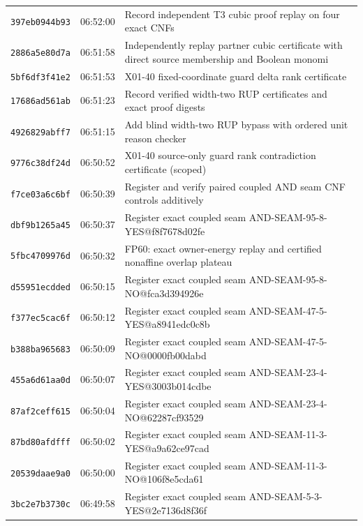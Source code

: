 \documentclass[11pt]{article}
\theoremstyle{remark}
\begin{document}
\begin{longtable}{lll}
\texttt{397eb0944b93} & 06:52:00 & {\footnotesize Record independent T3 cubic proof replay on four exact CNFs}\\
\texttt{2886a5e80d7a} & 06:51:58 & {\footnotesize Independently replay partner cubic certificate with direct source membership and Boolean monomi}\\
\texttt{5bf6df3f41e2} & 06:51:53 & {\footnotesize X01-40 fixed-coordinate guard delta rank certificate}\\
\texttt{17686ad561ab} & 06:51:23 & {\footnotesize Record verified width-two RUP certificates and exact proof digests}\\
\texttt{4926829abff7} & 06:51:15 & {\footnotesize Add blind width-two RUP bypass with ordered unit reason checker}\\
\texttt{9776c38df24d} & 06:50:52 & {\footnotesize X01-40 source-only guard rank contradiction certificate (scoped)}\\
\texttt{f7ce03a6c6bf} & 06:50:39 & {\footnotesize Register and verify paired coupled AND seam CNF controls additively}\\
\texttt{dbf9b1265a45} & 06:50:37 & {\footnotesize Register exact coupled seam AND-SEAM-95-8-YES@f8f7678d02fe}\\
\texttt{5fbc4709976d} & 06:50:32 & {\footnotesize FP60: exact owner-energy replay and certified nonaffine overlap plateau}\\
\texttt{d55951ecdded} & 06:50:15 & {\footnotesize Register exact coupled seam AND-SEAM-95-8-NO@fca3d394926e}\\
\texttt{f377ec5cac6f} & 06:50:12 & {\footnotesize Register exact coupled seam AND-SEAM-47-5-YES@a8941edc0c8b}\\
\texttt{b388ba965683} & 06:50:09 & {\footnotesize Register exact coupled seam AND-SEAM-47-5-NO@0000fb00dabd}\\
\texttt{455a6d61aa0d} & 06:50:07 & {\footnotesize Register exact coupled seam AND-SEAM-23-4-YES@3003b014cdbe}\\
\texttt{87af2ceff615} & 06:50:04 & {\footnotesize Register exact coupled seam AND-SEAM-23-4-NO@62287cf93529}\\
\texttt{87bd80afdfff} & 06:50:02 & {\footnotesize Register exact coupled seam AND-SEAM-11-3-YES@a9a62ce97cad}\\
\texttt{20539daae9a0} & 06:50:00 & {\footnotesize Register exact coupled seam AND-SEAM-11-3-NO@106f8e5cda61}\\
\texttt{3bc2e7b3730c} & 06:49:58 & {\footnotesize Register exact coupled seam AND-SEAM-5-3-YES@2e7136d8f36f}\\

\end{longtable}
\end{document}
